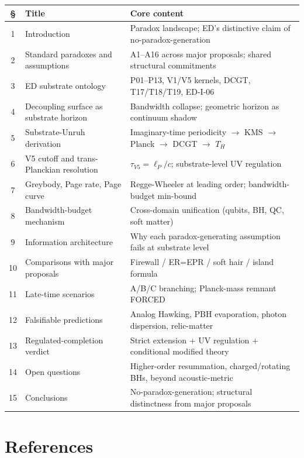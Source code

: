 \documentclass[11pt,a4paper]{article}
\begin{document}
\begin{center}
\small
\begin{tabular}{@{}cp{4.6cm}p{8.2cm}@{}}
\toprule
\S & Title & Core content \\
\midrule
1 & Introduction & Paradox landscape; ED's distinctive claim of no-paradox-generation \\
2 & Standard paradoxes and assumptions & A1--A16 across major proposals; shared structural commitments \\
3 & ED substrate ontology & P01--P13, V1/V5 kernels, DCGT, T17/T18/T19, ED-I-06 \\
4 & Decoupling surface as substrate horizon & Bandwidth collapse; geometric horizon as continuum shadow \\
5 & Substrate-Unruh derivation & Imaginary-time periodicity $\to$ KMS $\to$ Planck $\to$ DCGT $\to$ $T_H$ \\
6 & V5 cutoff and trans-Planckian resolution & $\tau_{V5} = \ell_P/c$; substrate-level UV regulation \\
7 & Greybody, Page rate, Page curve & Regge-Wheeler at leading order; bandwidth-budget min-bound \\
8 & Bandwidth-budget mechanism & Cross-domain unification (qubits, BH, QC, soft matter) \\
9 & Information architecture & Why each paradox-generating assumption fails at substrate level \\
10 & Comparisons with major proposals & Firewall / ER=EPR / soft hair / island formula \\
11 & Late-time scenarios & A/B/C branching; Planck-mass remnant FORCED \\
12 & Falsifiable predictions & Analog Hawking, PBH evaporation, photon dispersion, relic-matter \\
13 & Regulated-completion verdict & Strict extension + UV regulation + conditional modified theory \\
14 & Open questions & Higher-order resummation, charged/rotating BHs, beyond acoustic-metric \\
15 & Conclusions & No-paradox-generation; structural distinctness from major proposals \\
\bottomrule
\end{tabular}
\end{center}

\section*{References}
\end{document}

